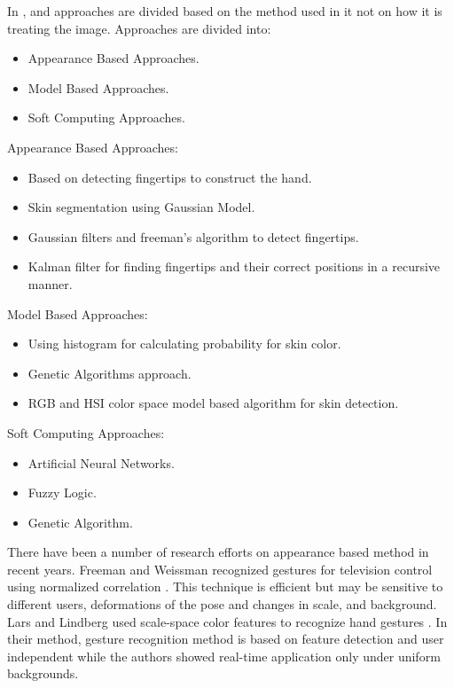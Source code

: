 In \cite{yrel1},\cite{relatedsg1} and \cite{relatedsg2}  approaches are divided based on the method used in it not on how it is treating the image. Approaches are divided into:
\begin{itemize}
\item Appearance Based Approaches.
\item Model Based Approaches.
\item Soft Computing Approaches.
\end{itemize}

\bigskip

Appearance Based Approaches:
\begin{itemize}

\item Based on detecting fingertips to construct the hand.
\item Skin segmentation using Gaussian Model.
\item Gaussian filters and freeman's algorithm to detect fingertips.
\item Kalman filter for finding fingertips and their correct positions in a recursive manner.
\end{itemize}

\bigskip

Model Based Approaches:
\begin{itemize}
\item Using histogram for calculating probability for skin color.
\item Genetic Algorithms approach.
\item RGB and HSI color space model based algorithm for skin detection.	
\end{itemize}

\bigskip
Soft Computing Approaches:
\begin{itemize}
\item Artificial Neural Networks.
\item Fuzzy Logic.
\item Genetic Algorithm.
\end{itemize}

\bigskip



There have been a number of research efforts on appearance based method in recent years. Freeman and Weissman recognized gestures for television control using normalized correlation \cite{relatedsg3}. This technique is efficient but may be sensitive to different users, deformations of the pose and changes in scale, and background. Lars and Lindberg used scale-space color features to recognize hand gestures \cite{relatedsg4}. In their method, gesture recognition method is based on feature detection and user independent while the authors showed real-time application only under uniform backgrounds.
\bigskip

